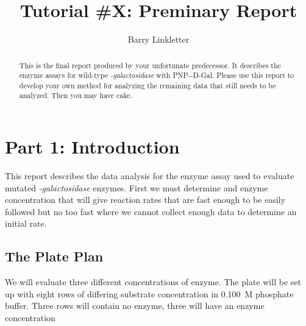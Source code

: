 \documentclass[]{tufte-handout}
\title{Tutorial \#X: Preminary Report}
\author[Barry Linkletter]{Barry Linkletter}
\date{} %
\begin{document}
\justifying


\maketitle%

\begin{abstract}
\noindent This is the final report produced by your unfortunate predecessor. It describes the enzyme assays for wild-type \emph{\textbeta -galactosidase} with PNP-\textbeta-D-Gal. Please use this report to develop your own method for analyzing the remaining data that still needs to be analyzed. Then you may have cake.

\end{abstract}





\section{Part 1: Introduction}

This report describes the data analysis for the enzyme assay used to evaluate mutated \emph{\textbeta -galactosidase} enzymes. First we must determine and enzyme conc\-en\-trat\-ion that will give reaction rates that are fast enough to be easily followed but no too fast where we cannot collect enough data to determine an initial rate. 

\subsection{The Plate Plan}

We will evaluate three different concentrations of enzyme. The plate will be set up with eight rows of differing substrate concentration in \qty{0.100}{M} phosphate buffer. Three rows will contain no enzyme, three will have an enzyme concentration
\end{document}

